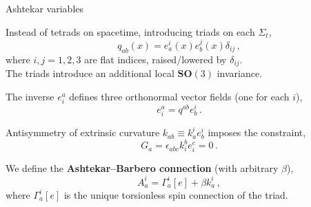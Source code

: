 \documentclass{beamer}
\newcommand\boldtext[1]{\textcolor{bolds}{\textbf{#1}}}
\begin{document}
\begin{frame}{Ashtekar variables}
    \begin{list}{\maltese}{\leftmargin=1em \itemindent=0em}
        \item<1-> Instead of tetrads on spacetime, introducing triads on each $\Sigma_t$,
        \begin{equation}
            q_{ab}(x)=e_a^i(x)e_b^j(x)\delta_{ij}\,,
        \end{equation}
        where $i,j=1,2,3$ are flat indices, raised/lowered by $\delta_{ij}$.\\
        The triads introduce an additional local $\mathbf{SO}(3)$ invariance.
        \item<2-> The inverse $e^a_i$ defines three orthonormal vector fields (one for each $i$),
        \begin{equation}
            e^a_i=q^{ab}e_b^i\,.
        \end{equation}
        \item<3-> Antisymmetry of extrinsic curvature $k_{ab}\equiv k_a^i e_b^i$ imposes the constraint,
        \begin{equation}
            G_a=\epsilon_{abc}k^b_i e^c_i=0\,.
        \end{equation}
        \item<4-> We define the \boldtext{Ashtekar–Barbero connection} (with arbitrary $\beta$),
        \begin{equation}
            A_a^i=\Gamma_a^i[e]+\beta k_a^i\,,
        \end{equation}
        where $\Gamma_a^i[e]$ is the unique torsionless spin connection of the triad.
    \end{list}
\end{frame}
\end{document}
